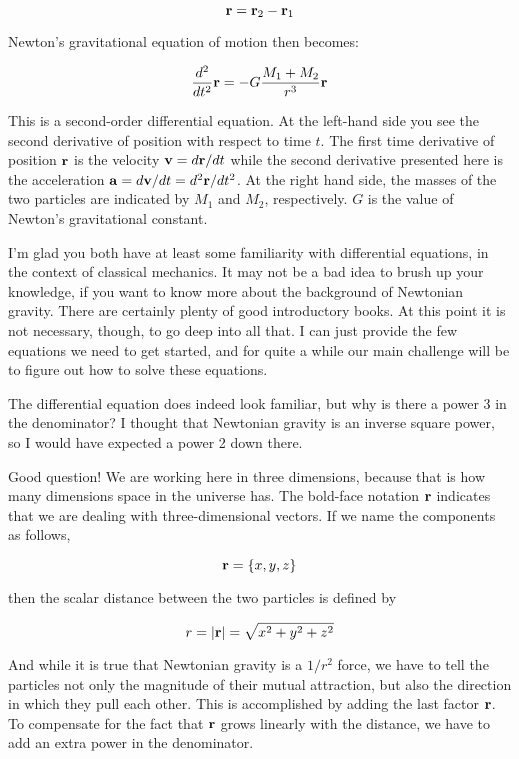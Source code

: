 \begin{equation}
{\bf r} = {\bf r}_2 - {\bf r}_1
\end{equation}

Newton's gravitational equation of motion then becomes:

\begin{equation}
\frac{d^2}{dt^2}{\bf r} = - G \frac{M_1 + M_2}{r^3}{\bf r}
\end{equation}

This is a second-order differential equation.  At the left-hand side
you see the second derivative of position with respect to time $t$.  The
first time derivative of position ${\bf r}$ is the velocity ${\bf v} = d{\bf r} /dt$
while the second derivative presented here is the acceleration
${\bf a} = d{\bf v} /dt = d^2{\bf r} /dt^2 $.  At the right hand side, the masses
of the two particles are indicated by $M_1$ and $M_2$, respectively.
$G$ is the value of Newton's gravitational constant.

I'm glad you both have at least some familiarity with differential
equations, in the context of classical mechanics.  It may not be a bad
idea to brush up your knowledge, if you want to know more about the
background of Newtonian gravity.  There are certainly plenty of good
introductory books.  At this point it is not necessary, though, to go
deep into all that.  I can just provide the few equations we need to
get started, and for quite a while our main challenge will be to
figure out how to solve these equations.

\bob
The differential equation does indeed look familiar, but why is there
a power 3 in the denominator?  I thought that Newtonian gravity is an
inverse square power, so I would have expected a power 2 down there.

\alice
Good question!  We are working here in three dimensions, because that
is how many dimensions space in the universe has.  The bold-face
notation ${\bf r}$ indicates that we are dealing with three-dimensional
vectors.  If we name the components as follows,

\begin{equation}
{\bf r} = \{x, y, z\}
\end{equation}

then the scalar distance between the two particles is defined by

\begin{equation}
r = | {\bf r} | = \sqrt{x^2+y^2+z^2}
\end{equation}

And while it is true that Newtonian gravity is a $1/r^2$ force, we
have to tell the particles not only the magnitude of their mutual
attraction, but also the direction in which they pull each other.
This is accomplished by adding the last factor ${\bf r}$.  To compensate
for the fact that ${\bf r}$ grows linearly with the distance, we have to
add an extra power in the denominator.

